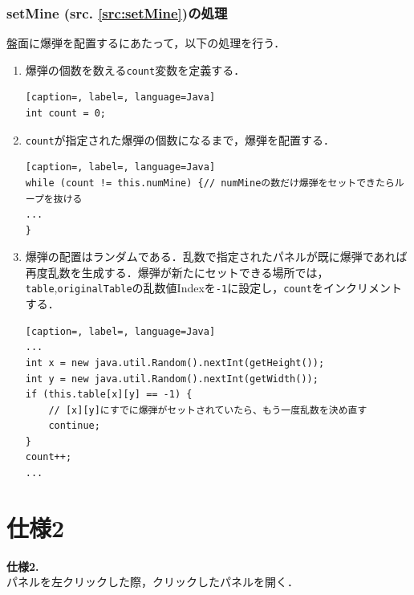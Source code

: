 \documentclass[a4j,11pt]{jsarticle}
\newcommand{\srcref}[1]{src. \ref{#1}}
\newcommand{\met}[1]{\ttfamily #1 \normalfont (\srcref{src:#1})の処理}
\begin{document}
\subsubsection*{\met{setMine}}
盤面に爆弾を配置するにあたって，以下の処理を行う．
\begin{enumerate}
    \item 爆弾の個数を数える\verb|count|変数を定義する．
          \begin{lstlisting}[caption=, label=, language=Java]
int count = 0;
\end{lstlisting}
    \item \verb|count|が指定された爆弾の個数になるまで，爆弾を配置する．
          \begin{lstlisting}[caption=, label=, language=Java]
while (count != this.numMine) {// numMineの数だけ爆弾をセットできたらループを抜ける
...
}
    \end{lstlisting}
    \item 爆弾の配置はランダムである．乱数で指定されたパネルが既に爆弾であれば再度乱数を生成する．爆弾が新たにセットできる場所では，\verb|table|,\verb|originalTable|の乱数値Indexを\verb|-1|に設定し，\verb|count|をインクリメントする．
          \begin{lstlisting}[caption=, label=, language=Java]
...
int x = new java.util.Random().nextInt(getHeight());
int y = new java.util.Random().nextInt(getWidth());
if (this.table[x][y] == -1) {
    // [x][y]にすでに爆弾がセットされていたら、もう一度乱数を決め直す
    continue;
}
count++;
...
    \end{lstlisting}
\end{enumerate}
\newpage
\section*{仕様2}
\setcounter{subsection}{0}
\setcounter{section}{2}
\begin{screen}
    \textbf{仕様2.}\\
    パネルを左クリックした際，クリックしたパネルを開く．
\end{screen}
\end{document}
